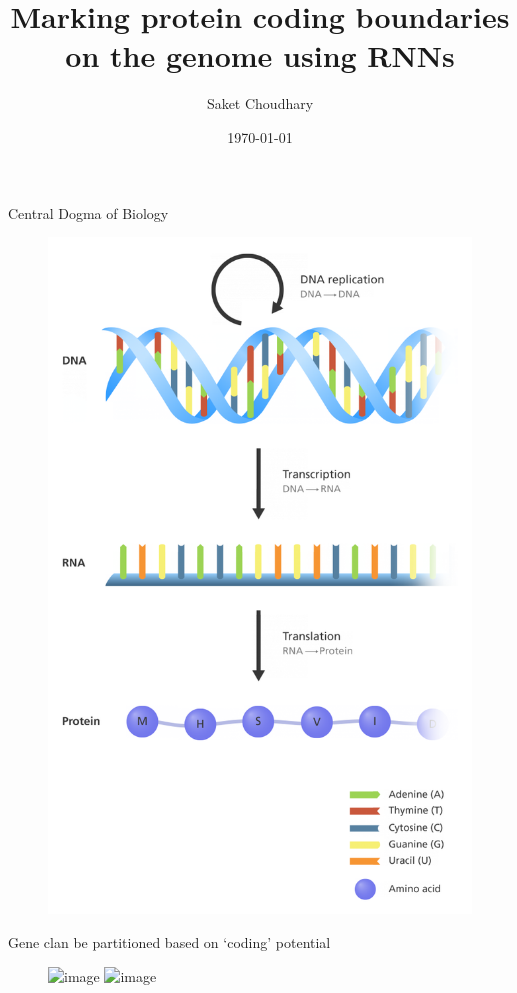 \documentclass[11pt]{beamer}
\title{Marking protein coding boundaries on the genome using RNNs}
\subtitle{}
\date{\today}
\author{Saket Choudhary}
\institute{}
\begin{document}
\maketitle
\begin{frame}{Central Dogma of Biology}
\begin{figure}
\includegraphics[width=\textwidth,height=\textheight,keepaspectratio]{central_dogma}
\end{figure}

\end{frame}

\begin{frame}{Gene clan be partitioned based on `coding' potential}
\begin{figure}
\includegraphics<1>[width=\linewidth]{MRNA_structure.png}
\includegraphics<2>[width=\linewidth]{distribution.png}
\end{figure}
\cite{calviello_beyond_2017}
\end{frame}
\end{document}
